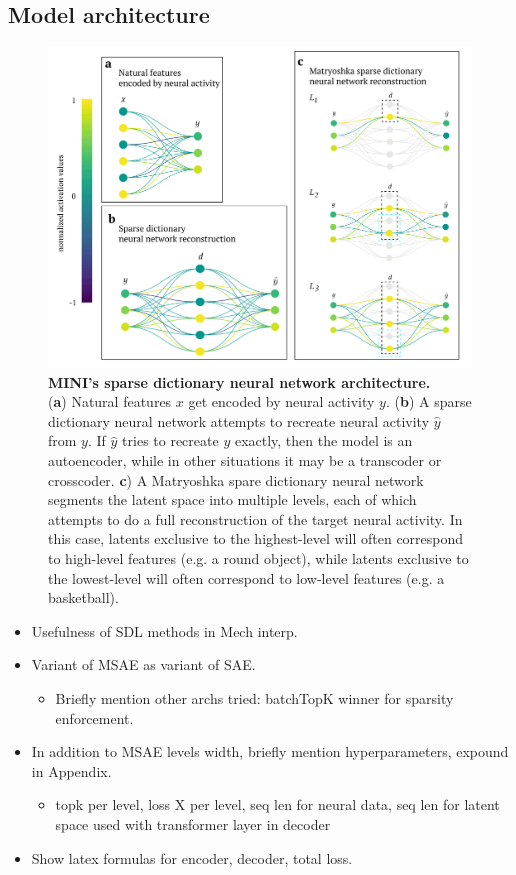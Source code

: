 \subsection{Model architecture}

\begin{figure}[h]
    \centering
    \includegraphics[width=0.5\linewidth]{figures/sdnn_arch.pdf}
    \caption{
        \textbf{MINI's sparse dictionary neural network architecture.} \\
        \small (\textbf{a}) Natural features $x$ get encoded by neural activity $y$. (\textbf{b}) A sparse dictionary neural network attempts to recreate neural activity $\hat{y}$ from $y$. If $\hat{y}$ tries to recreate $y$ exactly, then the model is an autoencoder, while in other situations it may be a transcoder or crosscoder. \textbf{c}) A Matryoshka spare dictionary neural network segments the latent space into multiple levels, each of which attempts to do a full reconstruction of the target neural activity. In this case, latents exclusive to the highest-level will often correspond to high-level features (e.g. a round object), while latents exclusive to the lowest-level will often correspond to low-level features (e.g. a basketball).
    }
    \label{fig:sdnn_arch}
\end{figure}

\begin{itemize}
    \item Usefulness of SDL methods in Mech interp.
    
    \item Variant of MSAE as variant of SAE.
    \begin{itemize}
        \item Briefly mention other archs tried: batchTopK winner for sparsity enforcement.
    \end{itemize}
    
    \item In addition to MSAE levels width, briefly mention hyperparameters, expound in Appendix.
    \begin{itemize}
        \item topk per level, loss X per level, seq len for neural data, seq len for latent space used with transformer layer in decoder
    \end{itemize}
    
    \item Show latex formulas for encoder, decoder, total loss.
\end{itemize}
